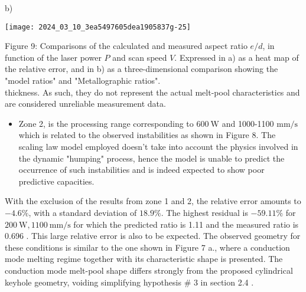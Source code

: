 \documentclass[10pt]{article}
\begin{document}
b)

\begin{center}
\texttt{[image: 2024\_03\_10\_3ea5497605dea1905837g-25]}
\end{center}

Figure 9: Comparisons of the calculated and measured aspect ratio $e / d$, in function of the laser power $P$ and scan speed $V$. Expressed in a) as a heat map of the relative error, and in b) as a three-dimensional comparison showing the "model ratios" and "Metallographic ratios".\\
thickness. As such, they do not represent the actual melt-pool characteristics and are considered unreliable measurement data.

\begin{itemize}
  \item Zone 2, is the processing range corresponding to $600 \mathrm{~W}$ and 1000-1100 $\mathrm{mm} / \mathrm{s}$ which is related to the observed instabilities as shown in Figure 8. The scaling law model employed doesn't take into account the physics involved in the dynamic "humping" process, hence the model is unable to predict the occurrence of such instabilities and is indeed expected to show poor predictive capacities.
\end{itemize}

With the exclusion of the results from zone 1 and 2, the relative error amounts to $-4.6 \%$, with a standard deviation of $18.9 \%$. The highest residual is $-59.11 \%$ for $200 \mathrm{~W}, 1100 \mathrm{~mm} / \mathrm{s}$ for which the predicted ratio is 1.11 and the measured ratio is 0.696 . This large relative error is also to be expected. The observed geometry for these conditions is similar to the one shown in Figure 7 a., where a conduction mode melting regime together with its characteristic shape is presented. The conduction mode melt-pool shape differs strongly from the proposed cylindrical keyhole geometry, voiding simplifying hypothesis \# 3 in section 2.4 .
\end{document}
